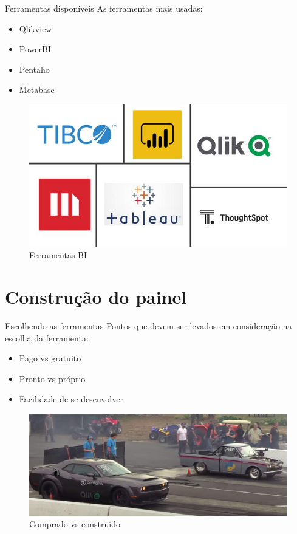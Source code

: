 \documentclass[10pt,t]{beamer}
\begin{document}
\begin{frame}{Ferramentas disponíveis}\label{colorpalette}
	\vspace{8pt}
	As ferramentas mais usadas:
	\begin{itemize}
		\item Qlikview
		\item PowerBI
		\item Pentaho
		\item Metabase
	\end{itemize}
\begin{figure}
	\centering
	\includegraphics[scale=0.40]{./imagens/bi_tools.jpg}
	\caption{Ferramentas BI}
\end{figure}
\end{frame} 

\section{Construção do painel}

\begin{frame}{Escolhendo as ferramentas}\label{colorpalette}
	\vspace{8pt}
	Pontos que devem ser levados em consideração na escolha da ferramenta:
	\begin{itemize}
		\item Pago vs gratuito
		\item Pronto vs próprio
		\item Facilidade de se desenvolver
	\end{itemize}
\begin{figure}
	\centering
	\includegraphics[scale=0.25]{./imagens/pronto_vs_construido_escolhido.jpg}
	\caption{Comprado vs construído}
\end{figure}
\end{frame} 
\end{document}

